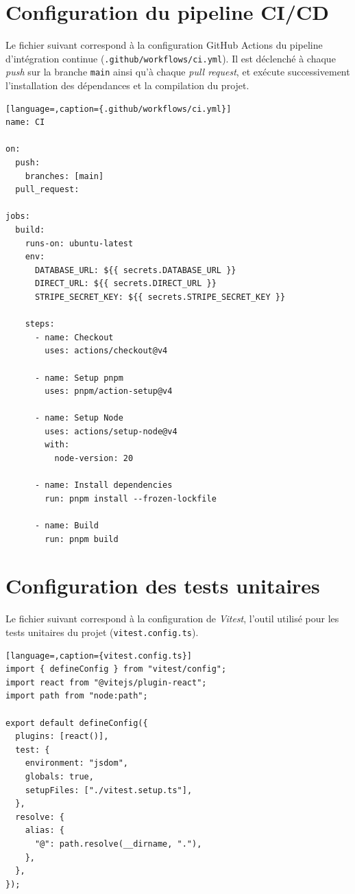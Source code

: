 \documentclass{article}
\begin{document}
\section{Configuration du pipeline CI/CD}

Le fichier suivant correspond à la configuration GitHub Actions du pipeline
d'intégration continue (\texttt{.github/workflows/ci.yml}).
Il est déclenché à chaque \textit{push} sur la branche \texttt{main} ainsi
qu'à chaque \textit{pull request}, et exécute successivement l'installation
des dépendances et la compilation du projet.

\begin{lstlisting}[language=,caption={.github/workflows/ci.yml}]
name: CI

on:
  push:
    branches: [main]
  pull_request:

jobs:
  build:
    runs-on: ubuntu-latest
    env:
      DATABASE_URL: ${{ secrets.DATABASE_URL }}
      DIRECT_URL: ${{ secrets.DIRECT_URL }}
      STRIPE_SECRET_KEY: ${{ secrets.STRIPE_SECRET_KEY }}

    steps:
      - name: Checkout
        uses: actions/checkout@v4

      - name: Setup pnpm
        uses: pnpm/action-setup@v4

      - name: Setup Node
        uses: actions/setup-node@v4
        with:
          node-version: 20

      - name: Install dependencies
        run: pnpm install --frozen-lockfile

      - name: Build
        run: pnpm build
\end{lstlisting}

\newpage

\section{Configuration des tests unitaires}

Le fichier suivant correspond à la configuration de \textit{Vitest},
l'outil utilisé pour les tests unitaires du projet (\texttt{vitest.config.ts}).

\begin{lstlisting}[language=,caption={vitest.config.ts}]
import { defineConfig } from "vitest/config";
import react from "@vitejs/plugin-react";
import path from "node:path";

export default defineConfig({
  plugins: [react()],
  test: {
    environment: "jsdom",
    globals: true,
    setupFiles: ["./vitest.setup.ts"],
  },
  resolve: {
    alias: {
      "@": path.resolve(__dirname, "."),
    },
  },
});
\end{lstlisting}
\end{document}
